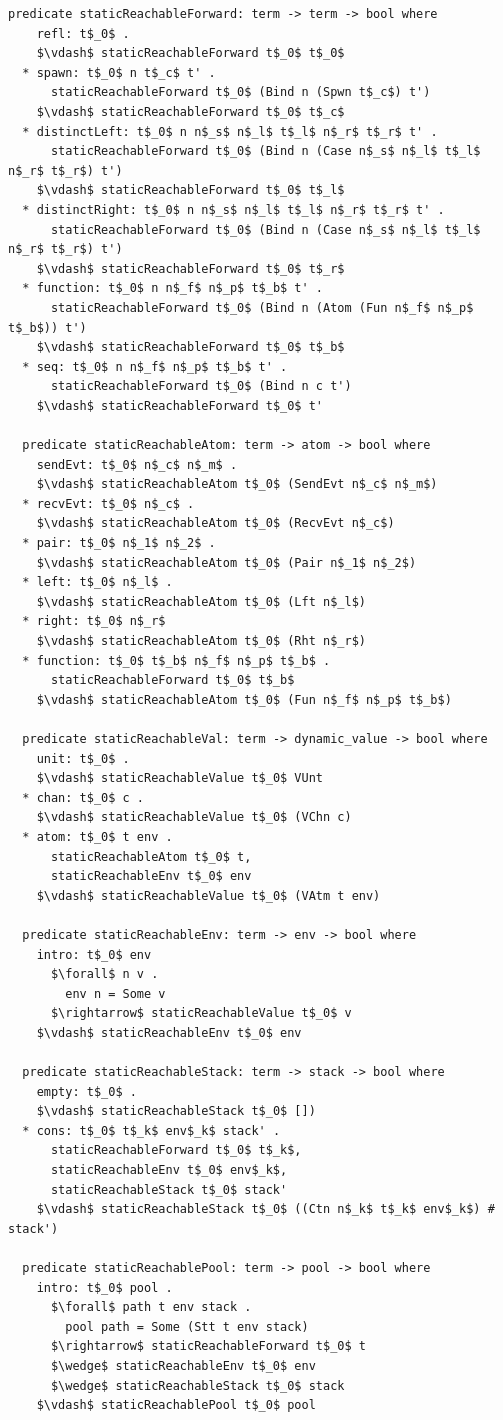 \documentclass[letterpaper, 11pt]{extarticle}
\begin{document}
\begin{lstlisting}[language=logic, mathescape]
  predicate staticReachableForward: term -> term -> bool where
    refl: t$_0$ .
    $\vdash$ staticReachableForward t$_0$ t$_0$
  * spawn: t$_0$ n t$_c$ t' .
      staticReachableForward t$_0$ (Bind n (Spwn t$_c$) t')
    $\vdash$ staticReachableForward t$_0$ t$_c$
  * distinctLeft: t$_0$ n n$_s$ n$_l$ t$_l$ n$_r$ t$_r$ t' .
      staticReachableForward t$_0$ (Bind n (Case n$_s$ n$_l$ t$_l$ n$_r$ t$_r$) t')
    $\vdash$ staticReachableForward t$_0$ t$_l$
  * distinctRight: t$_0$ n n$_s$ n$_l$ t$_l$ n$_r$ t$_r$ t' .
      staticReachableForward t$_0$ (Bind n (Case n$_s$ n$_l$ t$_l$ n$_r$ t$_r$) t')
    $\vdash$ staticReachableForward t$_0$ t$_r$
  * function: t$_0$ n n$_f$ n$_p$ t$_b$ t' .
      staticReachableForward t$_0$ (Bind n (Atom (Fun n$_f$ n$_p$ t$_b$)) t')
    $\vdash$ staticReachableForward t$_0$ t$_b$
  * seq: t$_0$ n n$_f$ n$_p$ t$_b$ t' .
      staticReachableForward t$_0$ (Bind n c t')
    $\vdash$ staticReachableForward t$_0$ t'

  predicate staticReachableAtom: term -> atom -> bool where
    sendEvt: t$_0$ n$_c$ n$_m$ .
    $\vdash$ staticReachableAtom t$_0$ (SendEvt n$_c$ n$_m$)
  * recvEvt: t$_0$ n$_c$ .
    $\vdash$ staticReachableAtom t$_0$ (RecvEvt n$_c$)
  * pair: t$_0$ n$_1$ n$_2$ .
    $\vdash$ staticReachableAtom t$_0$ (Pair n$_1$ n$_2$)
  * left: t$_0$ n$_l$ .
    $\vdash$ staticReachableAtom t$_0$ (Lft n$_l$)
  * right: t$_0$ n$_r$
    $\vdash$ staticReachableAtom t$_0$ (Rht n$_r$)
  * function: t$_0$ t$_b$ n$_f$ n$_p$ t$_b$ . 
      staticReachableForward t$_0$ t$_b$ 
    $\vdash$ staticReachableAtom t$_0$ (Fun n$_f$ n$_p$ t$_b$)

  predicate staticReachableVal: term -> dynamic_value -> bool where
    unit: t$_0$ .
    $\vdash$ staticReachableValue t$_0$ VUnt
  * chan: t$_0$ c .
    $\vdash$ staticReachableValue t$_0$ (VChn c)
  * atom: t$_0$ t env .
      staticReachableAtom t$_0$ t, 
      staticReachableEnv t$_0$ env
    $\vdash$ staticReachableValue t$_0$ (VAtm t env)

  predicate staticReachableEnv: term -> env -> bool where
    intro: t$_0$ env
      $\forall$ n v . 
        env n = Some v
      $\rightarrow$ staticReachableValue t$_0$ v
    $\vdash$ staticReachableEnv t$_0$ env

  predicate staticReachableStack: term -> stack -> bool where
    empty: t$_0$ .
    $\vdash$ staticReachableStack t$_0$ [])
  * cons: t$_0$ t$_k$ env$_k$ stack' .
      staticReachableForward t$_0$ t$_k$, 
      staticReachableEnv t$_0$ env$_k$,
      staticReachableStack t$_0$ stack' 
    $\vdash$ staticReachableStack t$_0$ ((Ctn n$_k$ t$_k$ env$_k$) # stack')

  predicate staticReachablePool: term -> pool -> bool where
    intro: t$_0$ pool .
      $\forall$ path t env stack .
        pool path = Some (Stt t env stack) 
      $\rightarrow$ staticReachableForward t$_0$ t
      $\wedge$ staticReachableEnv t$_0$ env
      $\wedge$ staticReachableStack t$_0$ stack
    $\vdash$ staticReachablePool t$_0$ pool

\end{lstlisting}
\end{document}
